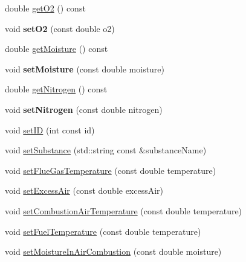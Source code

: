 \begin{DoxyCompactItemize}
\item 
double \hyperlink{class_solid_liquid_flue_gas_material_a08d588e576f605d3f9925cb649e1105e}{get\+O2} () const
\item 
\mbox{\label{class_solid_liquid_flue_gas_material_afb57fdbeeccdb58fffec6d6446891409}} 
void {\bfseries set\+O2} (const double o2)
\item 
double \hyperlink{class_solid_liquid_flue_gas_material_accf3c8be942d0ba244f6eabab6e7012b}{get\+Moisture} () const
\item 
\mbox{\label{class_solid_liquid_flue_gas_material_ac811fd9fee43bc497dc53c1e55c17fea}} 
void {\bfseries set\+Moisture} (const double moisture)
\item 
double \hyperlink{class_solid_liquid_flue_gas_material_a76159a5d9d609f0e0131f7bca3b60ebc}{get\+Nitrogen} () const
\item 
\mbox{\label{class_solid_liquid_flue_gas_material_a7082dd41a06397a8ae714096c091bfbe}} 
void {\bfseries set\+Nitrogen} (const double nitrogen)
\item 
void \hyperlink{class_solid_liquid_flue_gas_material_a6046d06703bd496745121b62eab4f40f}{set\+ID} (int const id)
\item 
void \hyperlink{class_solid_liquid_flue_gas_material_a54be915432c1300c4d8eaf7bf2be361f}{set\+Substance} (std\+::string const \&substance\+Name)
\item 
void \hyperlink{class_solid_liquid_flue_gas_material_ae647700dbff5ccea7938b2117f2c3156}{set\+Flue\+Gas\+Temperature} (const double temperature)
\item 
void \hyperlink{class_solid_liquid_flue_gas_material_a7a3f9f77d267afc05f5fde1da9329ec5}{set\+Excess\+Air} (const double excess\+Air)
\item 
void \hyperlink{class_solid_liquid_flue_gas_material_a626dfbc9ba87abff99e5c5a8204d69c6}{set\+Combustion\+Air\+Temperature} (const double temperature)
\item 
void \hyperlink{class_solid_liquid_flue_gas_material_a420ba1234c5f8c4b93f190b61046a589}{set\+Fuel\+Temperature} (const double temperature)
\item 
void \hyperlink{class_solid_liquid_flue_gas_material_a1a5f1bd3008e78cce62edb8aca642284}{set\+Moisture\+In\+Air\+Combustion} (const double moisture)
\item 

\end{DoxyCompactItemize}
